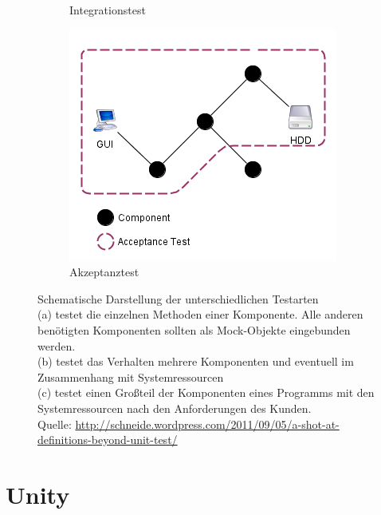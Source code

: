 \begin{figure}[h]
\begin{subfigure}[b]{0.29\textwidth}
	\caption{Integrationstest}
	\label{fig:Integration_Test}
	\end{subfigure}
	\begin{subfigure}[b]{0.39\textwidth}
	\centering
	\captionsetup{justification=centering}
	\includegraphics[width=\textwidth]{./images/Kapitel_Einleitung/Akzeptanz_Test.png}
	\caption{Akzeptanztest}
	\label{fig:Acceptance_Test}
	\end{subfigure}
\caption[Schematische Darstellung der unterschiedlichen Testarten]{Schematische Darstellung der unterschiedlichen Testarten\\(a) testet die einzelnen Methoden einer Komponente. Alle anderen benötigten Komponenten sollten als Mock-Objekte eingebunden werden.\\(b) testet das Verhalten mehrere Komponenten und eventuell im Zusammenhang mit Systemressourcen\\(c) testet einen Großteil der Komponenten eines Programms mit den Systemressourcen nach den Anforderungen des Kunden.\\
Quelle: \url{http://schneide.wordpress.com/2011/09/05/a-shot-at-definitions-beyond-unit-test/}}
\label{fig:UnitIntegrationAcceptanceTest_Comparison}
\end{figure}
\clearpage

\section{Unity}
\label{sec:Unity}

